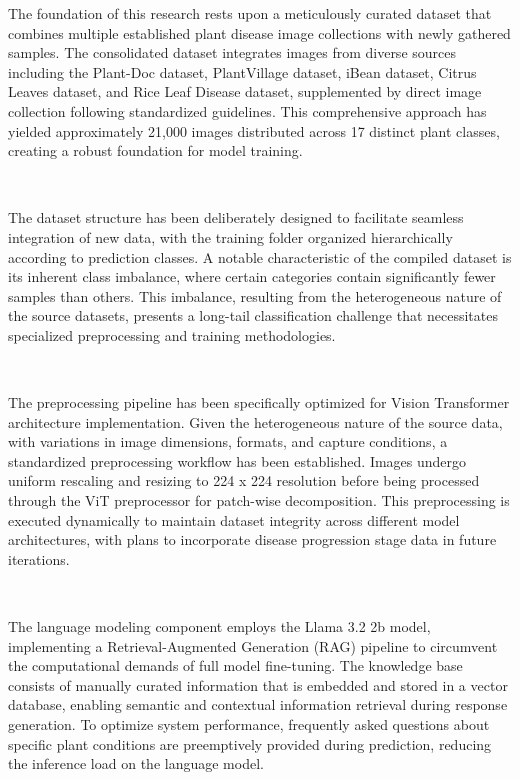 The foundation of this research rests upon a meticulously curated dataset that combines multiple established plant disease image collections with newly gathered samples. The consolidated dataset integrates images from diverse sources including the Plant-Doc dataset, PlantVillage dataset, iBean dataset, Citrus Leaves dataset, and Rice Leaf Disease dataset, supplemented by direct image collection following standardized guidelines. This comprehensive approach has yielded approximately 21,000 images distributed across 17 distinct plant classes, creating a robust foundation for model training.

\

The dataset structure has been deliberately designed to facilitate seamless integration of new data, with the training folder organized hierarchically according to prediction classes. A notable characteristic of the compiled dataset is its inherent class imbalance, where certain categories contain significantly fewer samples than others. This imbalance, resulting from the heterogeneous nature of the source datasets, presents a long-tail classification challenge that necessitates specialized preprocessing and training methodologies.

\

The preprocessing pipeline has been specifically optimized for Vision Transformer architecture implementation. Given the heterogeneous nature of the source data, with variations in image dimensions, formats, and capture conditions, a standardized preprocessing workflow has been established. Images undergo uniform rescaling and resizing to 224 x 224 resolution before being processed through the ViT preprocessor for patch-wise decomposition. This preprocessing is executed dynamically to maintain dataset integrity across different model architectures, with plans to incorporate disease progression stage data in future iterations.

\

The language modeling component employs the Llama 3.2 2b model, implementing a Retrieval-Augmented Generation (RAG) pipeline to circumvent the computational demands of full model fine-tuning. The knowledge base consists of manually curated information that is embedded and stored in a vector database, enabling semantic and contextual information retrieval during response generation. To optimize system performance, frequently asked questions about specific plant conditions are preemptively provided during prediction, reducing the inference load on the language model.

